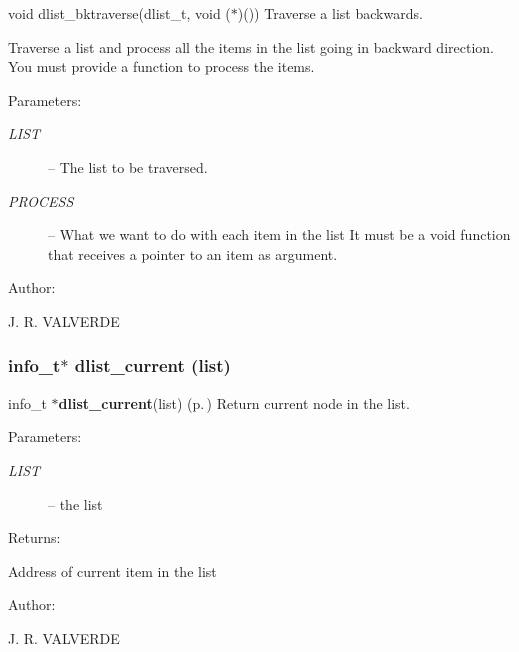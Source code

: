 void dlist\_\-bktraverse(dlist\_\-t, void ($\ast$)()) Traverse a list backwards.

Traverse a list and process all the items in the list going in backward direction. You must provide a function to process the items.\begin{Desc}
\item[Parameters: ]\par
\begin{description}
\item[{\em 
LIST}]-- The list to be traversed. \item[{\em 
PROCESS}]-- What we want to do with each item in the list It must be a void function that receives a pointer to an item as argument.\end{description}
\end{Desc}
\begin{Desc}
\item[Author: ]\par
J. R. VALVERDE \end{Desc}
\subsubsection{\setlength{\rightskip}{0pt plus 5cm}info\_\-t$\ast$ dlist\_\-current (list)}\label{P__dlist_8h_a12}


info\_\-t $\ast${\bf dlist\_\-current}(list) {\rm (p.\,\pageref{P__dlist_8h_a12})} Return current node in the list.

\begin{Desc}
\item[Parameters: ]\par
\begin{description}
\item[{\em 
LIST}]-- the list \end{description}
\end{Desc}
\begin{Desc}
\item[Returns: ]\par
Address of current item in the list\end{Desc}
\begin{Desc}
\item[Author: ]\par
J. R. VALVERDE \end{Desc}
